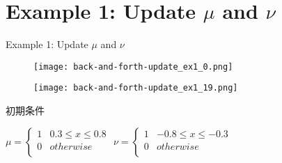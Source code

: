 \documentclass[aspectratio=169, dvipdfmx, 12pt]{beamer}
\begin{document}
\section{Example 1: Update $\mu$ and $\nu$}
\begin{frame}{Example 1: Update $\mu$ and $\nu$}
    \begin{figure}[htb]
        \begin{center}
            \begin{minipage}{0.45\hsize}
                \texttt{[image: back-and-forth-update\_ex1\_0.png]}
            \end{minipage}
            \begin{minipage}{0.45\hsize}
                \texttt{[image: back-and-forth-update\_ex1\_19.png]}
            \end{minipage}
        \end{center}
    \end{figure}
    \label{Example 1}

    初期条件
    \begin{center}
    $\mu = \left\{
        \begin{array}{ll}
            1 & 0.3 \le x \le 0.8 \\
            0 & otherwise \\
        \end{array}
    \right.
    $
    $\nu = \left\{
        \begin{array}{ll}
            1 & - 0.8 \le x \le - 0.3 \\
            0 & otherwise \\
        \end{array}
    \right.
    $
    \end{center}

\end{frame}

\end{document}

